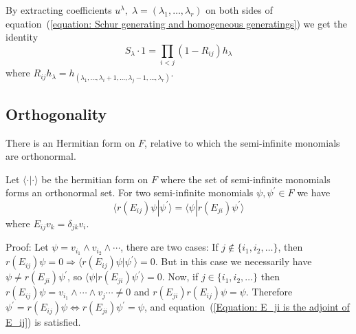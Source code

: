 \begin{dang}
    \begin{corollary}   
    By extracting coefficients $u^{\lambda},\;\lambda=(\lambda_1,\dots,\lambda_r)$ on both sides of 
    equation~(\ref{equation: Schur generating and homogeneous generatings})
    we get the identity
    \begin{equation}
        S_\lambda\cdot 1 = \prod_{i<j}(1-R_{ij})h_\lambda
    \end{equation}
    where $R_{ij}h_\lambda = h_{(\lambda_1,\dots,\lambda_i+1,\dots,\lambda_j-1,\dots,\lambda_r)}$. 
    \end{corollary}
\end{dang}


\subsection{Orthogonality}
There is an Hermitian form on $F$, relative to which the semi-infinite monomials are orthonormal. 
\begin{dang}
    \begin{lemma}\cite{kac2013bombay}\label{Lemma: E_ji is the adjoint of E_ij}
    Let $\langle\cdot|\cdot\rangle$ be the hermitian form on $F$ where the set of semi-infinite monomials forms an orthonormal set. For two semi-infinite monomials $\psi,\psi^\prime\in F$ we have
        \begin{equation}\label{Equation: E_ji is the adjoint of E_ij}
            \langle r(E_{ij})\psi|\psi^\prime \rangle=\langle \psi|r(E_{ji})\psi^\prime \rangle
        \end{equation}
        where $E_{ij}v_k = \delta_{jk}v_i$.
    \end{lemma}
\end{dang}
Proof: Let $\psi = v_{i_1}\wedge v_{i_2}\wedge \cdots$, there are two cases: If $j\notin\{i_1,i_2,\dots\}$, then $r(E_{ij})\psi=0\Rightarrow \langle r(E_{ij})\psi|\psi^\prime \rangle=0$. But in this case we necessarily have $\psi \neq r(E_{ji})\psi^\prime$, so $\langle \psi|r(E_{ji})\psi^\prime \rangle=0$. Now, if $j\in \{i_1,i_2,\dots\}$ then $r(E_{ij})\psi=v_{i_1}\wedge\cdots \wedge v_{j}\cdots \neq 0$ and $r(E_{ji})r(E_{ij})\psi = \psi$. Therefore $\psi^\prime = r(E_{ij})\psi \iff r(E_{ji})\psi^\prime = \psi$, and equation~(\ref{Equation: E_ji is the adjoint of E_ij}) is satisfied.\par

